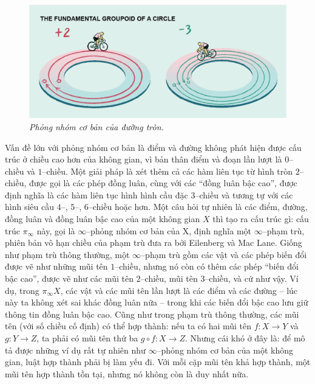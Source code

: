 \begin{multicols}{2}
	\begin{figure}[H]
		\centering
		\vspace*{-5pt}
		\captionsetup{labelformat= empty, justification=centering}
		\includegraphics[width=1\linewidth]{8}
		\caption{\small\textit{\color{duongvaotoanhoc}Phỏng nhóm cơ bản của đường tròn.}}
		\vspace*{-10pt}
	\end{figure}
	Vấn đề lớn với phỏng nhóm cơ bản là điểm và đường không phát hiện được cấu trúc ở chiều cao hơn của không gian, vì bản thân điểm và đoạn lần lượt là $0$--chiều và $1$--chiều. Một giải pháp là xét thêm cả các hàm liên tục từ hình tròn $2$--chiều, được gọi là các phép đồng luân, cùng với các ``đồng luân bậc cao'', được định nghĩa là các hàm liên tục hình hình cầu đặc $3$--chiều và tương tự với các hình siêu cầu $4$--, $5$--, $6$--chiều hoặc hơn.
	\vskip 0.1cm
	Một câu hỏi tự nhiên là các điểm, đường, đồng luân và đồng luân bậc cao của một không gian $X$ thì tạo ra cấu trúc gì: cấu trúc $\pi_\infty$ này, gọi là $\infty$--phỏng nhóm cơ bản của X, định nghĩa một $\infty$--phạm trù, phiên bản vô hạn chiều của phạm trù đưa ra bởi Eilenberg và Mac Lane. Giống như phạm trù thông thường, một $\infty$--phạm trù gồm các vật và các phép biến đổi được vẽ như những mũi tên $1$--chiều, nhưng nó còn có thêm các phép ``biến đổi bậc cao'', được vẽ như các mũi tên $2$--chiều, mũi tên $3$--chiều, và cứ như vậy. Ví dụ, trong $\pi_\infty X$, các vật và các mũi tên lần lượt là các điểm và các đường -- lúc này ta không xét sai khác đồng luân nữa -- trong khi các biến đổi bậc cao lưu giữ thông tin đồng luân bậc cao. Cũng như trong phạm trù thông thường, các mũi tên (với số chiều cố định) có thể hợp thành: nếu ta có hai mũi tên $f: X \to Y$ và $g: Y \to Z$, ta phải có mũi tên thứ ba $g \circ f: X \to Z$. Nhưng cái khó ở đây là: để mô tả được những ví dụ rất tự nhiên như $\infty$--phỏng nhóm cơ bản của một không gian, luật hợp thành phải bị làm yếu đi. Với mỗi cặp mũi tên khả hợp thành, một mũi tên hợp thành tồn tại, nhưng nó không còn là duy nhất nữa.

\end{multicols}
